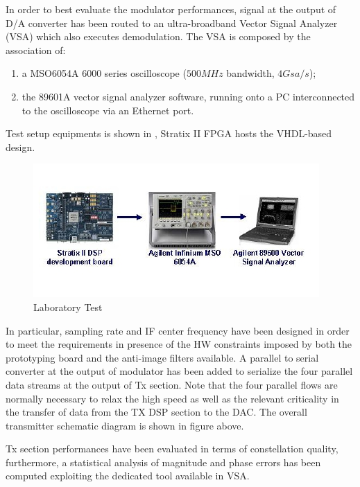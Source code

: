 In order to best evaluate the modulator performances, signal at the output of D/A converter has been routed to an ultra-broadband Vector Signal Analyzer (VSA) which also executes demodulation. The VSA is composed by the association of:

\begin{enumerate}

\item a MSO6054A 6000 series oscilloscope (\(500\unit{MHz}\) bandwidth, \(4\unit{Gsa/s}\));

\item the 89601A vector signal analyzer software, running onto a PC interconnected to the oscilloscope via an Ethernet port.

\end{enumerate}

Test setup equipments is shown in , Stratix II FPGA hosts the VHDL-based design.

\begin{figure} \centering
\includegraphics[scale=.8]{te1}
\caption{Laboratory Test} \label{fig:TestEqu}
\end{figure}

In particular, sampling rate and IF center frequency have been designed in order to meet the requirements in presence of the HW constraints imposed by both the prototyping board and the anti-image filters available. A parallel to serial converter at the output of modulator has been added to serialize the four parallel data streams at the output of Tx section. Note that the four parallel flows are normally necessary to relax the high speed as well as the relevant criticality in the transfer of data from the TX DSP section to the DAC. The overall transmitter schematic diagram is shown in figure above.

Tx section performances have been evaluated in terms of constellation quality, furthermore, a statistical analysis of magnitude and phase errors has been computed exploiting the dedicated tool available in VSA.

